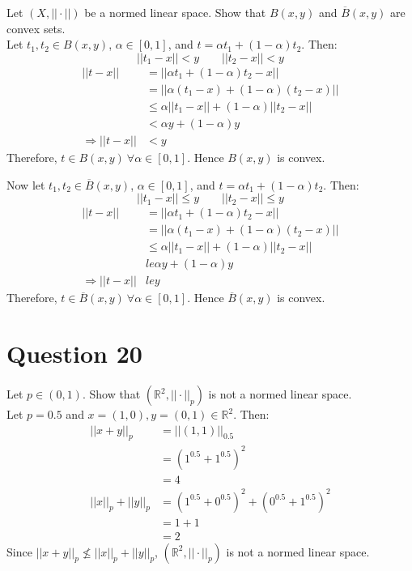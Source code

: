 \documentclass{article}
\begin{document}
	Let $(X, ||\cdot||)$ be a normed linear space.
	Show that $B(x, y)$ and $\overline{B}(x, y)$ are convex sets. \\

	Let $t_1, t_2 \in B(x, y)$, $\alpha \in [0, 1]$, and $t = \alpha t_1 + (1 - \alpha) t_2$.
	Then:
	\[ ||t_1 - x|| < y \qquad ||t_2 - x|| < y \]
	\begin{align*}
		||t - x|| &= ||\alpha t_1 + (1 - \alpha) t_2 - x|| \\
		&= ||\alpha (t_1 - x) + (1 - \alpha) (t_2 - x)|| \\
		&\le \alpha ||t_1 - x|| + (1 - \alpha) ||t_2 - x|| \\
		&< \alpha y + (1 - \alpha) y \\
		\Rightarrow ||t - x|| &< y
	\end{align*}
	Therefore, $t \in B(x, y) ~ \forall \alpha \in [0, 1]$.
	Hence $B(x, y)$ is convex.

	Now let $t_1, t_2 \in \overline{B}(x, y)$, $\alpha \in [0, 1]$, and
	$t = \alpha t_1 + (1 - \alpha) t_2$.
	Then:
	\[ ||t_1 - x|| \le y \qquad ||t_2 - x|| \le y \]
	\begin{align*}
		||t - x|| &= ||\alpha t_1 + (1 - \alpha) t_2 - x|| \\
		&= ||\alpha (t_1 - x) + (1 - \alpha) (t_2 - x)|| \\
		&\le \alpha ||t_1 - x|| + (1 - \alpha) ||t_2 - x|| \\
		&le \alpha y + (1 - \alpha) y \\
		\Rightarrow ||t - x|| &le y
	\end{align*}
	Therefore, $t \in \overline{B}(x, y) ~ \forall \alpha \in [0, 1]$.
	Hence $\overline{B}(x, y)$ is convex.

\section{Question 20}

	Let $p \in (0, 1)$. Show that $(\mathbb{R}^2, ||\cdot||_p)$ is not a normed linear space. \\

	Let $p = 0.5$ and $x = (1, 0), y = (0, 1) \in \mathbb{R}^2$.
	Then:
	\begin{align*}
		||x + y||_p &= ||(1, 1)||_{0.5} \\
		&= (1^{0.5} + 1^{0.5}) ^ 2 \\
		&= 4 \\
		||x||_p + ||y||_p &= (1^{0.5} + 0^{0.5}) ^ 2 + (0^{0.5} + 1^{0.5}) ^ 2 \\
		&= 1 + 1 \\
		&= 2
	\end{align*}
	Since $||x + y||_p \nleq ||x||_p + ||y||_p$, $(\mathbb{R}^2, ||\cdot||_p)$ is not a normed
	linear space.
\end{document}
